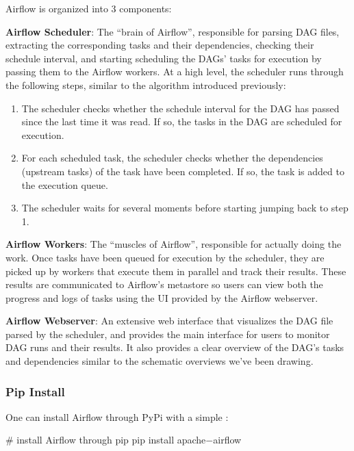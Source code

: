 Airflow is organized into 3 components:
\bit
\item \textbf{Airflow Scheduler}: The ``brain of Airflow'', responsible for parsing DAG files, extracting the
corresponding tasks and their dependencies, checking their schedule interval, and starting scheduling the DAGs' tasks
for execution by passing them to the Airflow workers. At a high level, the scheduler runs through the following steps,
similar to the algorithm introduced previously:
\begin{mdframed}
\begin{enumerate}
\item The scheduler checks whether the schedule interval for the DAG has passed since the last time it was read. If so,
the tasks in the DAG are scheduled for execution.
\item For each scheduled task, the scheduler checks whether the dependencies (upstream tasks) of the task have been
completed. If so, the task is added to the execution queue.
\item The scheduler waits for several moments before starting jumping back to step 1.
\end{enumerate}
\end{mdframed}
\item \textbf{Airflow Workers}: The ``muscles of Airflow'', responsible for actually doing the work. Once tasks have
been queued for execution by the scheduler, they are picked up by workers that execute them in parallel and track their
results. These results are communicated to Airflow's metastore so users can view both the progress and logs of tasks
using the UI provided by the Airflow webserver.
\item \textbf{Airflow Webserver}: An extensive web interface that visualizes the DAG file parsed by the scheduler, and
provides the main interface for users to monitor DAG runs and their results. It also provides a clear overview of the
DAG's tasks and dependencies similar to the schematic overviews we've been drawing.
\eit

\subsubsection{Pip Install}

One can install Airflow through PyPi with a simple :
\begin{bash}
# install Airflow through pip
pip install apache$-$airflow
\end{bash}

